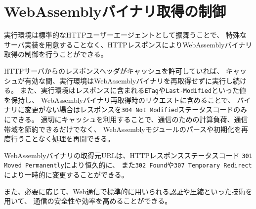 \section{WebAssemblyバイナリ取得の制御}

実行環境は標準的なHTTPユーザーエージェントとして振舞うことで、
特殊なサーバ実装を用意することなく、HTTPレスポンスによりWebAssemblyバイナリ取得の制御を行うことができる。

HTTPサーバからのレスポンスヘッダがキャッシュを許可していれば、
キャッシュが有効な間、実行環境はWebAssemblyバイナリを再取得せずに実行し続ける。
また、実行環境はレスポンスに含まれる\verb|ETag|や\verb|Last-Modified|といった値を保持し、
WebAssemblyバイナリ再取得時のリクエストに含めることで、
バイナリに変更がない場合はレスポンスを\verb|304 Not Modified|ステータスコードのみにできる。
適切にキャッシュを利用することで、通信のための計算負荷、通信帯域を節約できるだけでなく、
WebAssemblyモジュールのパースや初期化を再度行うことなく処理を再開できる。

WebAssemblyバイナリの取得元URLは、HTTPレスポンスステータスコード
\verb|301 Moved Permanently|により恒久的に、
また\verb|302 Found|や\verb|307 Temporary Redirect|により一時的に変更することができる。

また、必要に応じて、Web通信で標準的に用いられる認証や圧縮といった技術を用いて、
通信の安全性や効率を高めることができる。
